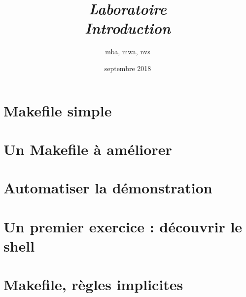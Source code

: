 \documentclass[french,10pt,A4]{report}
\begin{document}
\rfoot{\today}
\cfoot{ }
\renewcommand{\footrulewidth}{0.4pt}

\setlength{\parindent}{0pt} %

\lstset{frame=trBL}

\setcounter{tocdepth}{1}	%
\setcounter{secnumdepth}{5}	%

\newcommand{\titre}{Titre du sujet}	%

\thispagestyle{empty}

\title{\emph{Laboratoire\\\textbf{Introduction}}}
\author{mba, mwa, nvs}
\date{septembre 2018}
\maketitle
\tableofcontents
\newpage
%
\chapter{Makefile simple}
\chapter{Un Makefile à améliorer}
\chapter{Automatiser la démonstration}
\chapter{Un premier exercice : découvrir le shell}
\chapter{Makefile, règles implicites}
\end{document}
